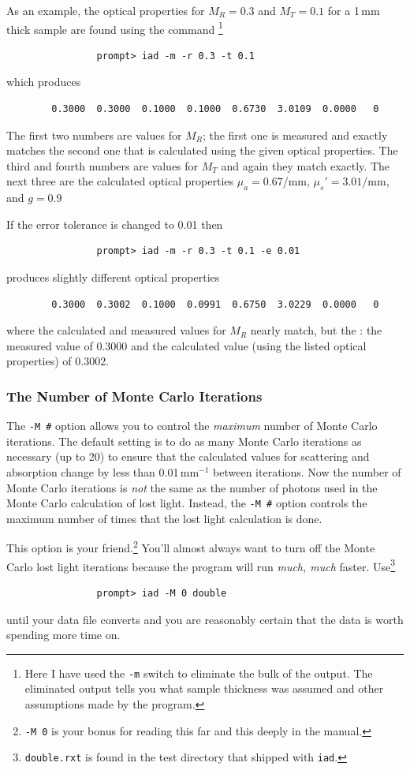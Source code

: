 \documentclass{article}
\newcommand\iadprog{\texttt{iad}}
\begin{document}
As an example, the optical properties for $M_R=0.3$ and $M_T=0.1$ for a 1\,mm thick sample
are found using the command%
\footnote{Here I have used the \texttt{-m} switch to eliminate the bulk
of the output.  The eliminated output tells you what sample thickness was assumed and other 
assumptions made by the program.}
\begin{verbatim}
                prompt> iad -m -r 0.3 -t 0.1
\end{verbatim}
which produces
\begin{verbatim}
        0.3000  0.3000  0.1000  0.1000  0.6730  3.0109  0.0000   0
\end{verbatim}
The first two numbers
are values for $M_R$; the first one is measured and exactly matches the
second one that is calculated using the given optical properties.  The third
and fourth numbers are values for $M_T$ and again they match exactly.  The next
three are the calculated optical properties 
$\mu_a=0.67$/mm, $\mu_s'=3.01$/mm, and $g=0.9$

If the
error tolerance is changed to 0.01 then
\begin{verbatim}
                prompt> iad -m -r 0.3 -t 0.1 -e 0.01
\end{verbatim}
produces slightly different optical properties
\begin{verbatim}
        0.3000  0.3002  0.1000  0.0991  0.6750  3.0229  0.0000   0
\end{verbatim}
where the calculated and measured values for $M_R$ nearly match, but the
: the measured value of
0.3000 and the calculated value (using the listed optical properties) of
0.3002.  

\subsubsection{The Number of Monte Carlo Iterations}

The \texttt{-M \#} option allows you to control the \textit{maximum} number of Monte
Carlo iterations.  The default setting is to do as many Monte Carlo iterations
as necessary (up to 20) to ensure that the calculated values for scattering and absorption
change by less than 0.01\,mm$^{-1}$ between iterations.  Now the number of Monte Carlo
iterations is \textit{not} the same as the number of photons used
in the Monte Carlo calculation of lost light.  Instead, the \texttt{-M \#} option
controls the maximum number of times that the lost light calculation is done.  

This option is your friend.\footnote{\texttt{-M 0} is your bonus for reading this far and
this deeply in the manual.} You'll almost always want to turn off the Monte Carlo
lost light iterations because the program will run \textit{much, much} faster.  
Use\footnote{\texttt{double.rxt} is found in the test directory that shipped with \iadprog{}.} 
\begin{verbatim}
                prompt> iad -M 0 double
\end{verbatim}
until your data file converts and you are reasonably certain that the data is 
worth spending more time on.  
\end{document}
